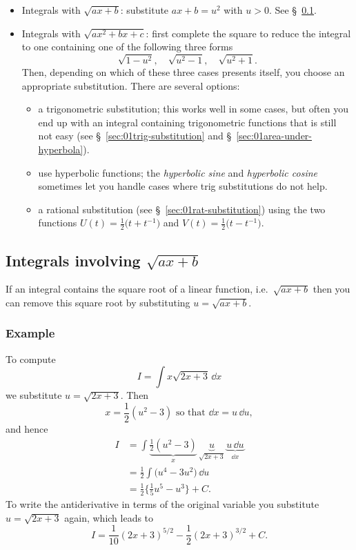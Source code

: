 \begin{itemize}
\item Integrals with $\sqrt{ax+b}$: substitute $ax+b = u^2$ with $u>0$. See
  \S~\ref{sec:01root-of-linear-integral}.
\item Integrals with $\sqrt{ax^2+bx+c}$: first complete the square to reduce the
  integral to one containing one of the following three forms
  \[
  \sqrt{1-u^2}, \quad \sqrt{u^2-1}, \quad \sqrt{u^2+1}.
  \]
  Then, depending on which of these three cases presents itself, you choose an
  appropriate substitution.  There are several options:
  \begin{itemize}
  \item a trigonometric substitution; this works well in some cases, but often
    you end up with an integral containing trigonometric functions that is still
    not easy (see \S~\ref{sec:01trig-substitution} and
    \S~\ref{sec:01area-under-hyperbola}).
  \item use hyperbolic functions; the \textit{hyperbolic sine} and
    \textit{hyperbolic cosine} sometimes let you handle cases where trig
    substitutions do not help.
  \item a rational substitution (see \S~\ref{sec:01rat-substitution}) using the
    two functions $U(t) = \frac{1} {2}\bigl(t+t^{-1}\bigr)$ and $V(t) = \frac{1}
    {2}\bigl(t-t^{-1}\bigr)$.
  \end{itemize}
\end{itemize}



\subsection{Integrals involving $\sqrt{ax+b}$}\label{sec:01root-of-linear-integral} %
If an integral contains the square root of a linear function, i.e.~$\sqrt{ax+b}$
then you can remove this square root by substituting $u=\sqrt{ax+b}$.

\subsubsection{Example} To compute
\[
I = \int x\sqrt{2x+3}\, \dd x
\]
we substitute $u=\sqrt{2x+3}$. Then
\[
x = \frac12(u^2-3)\text{ so that } \dd x = u\,\dd u,
\]
and hence
\begin{align*}
  I &= \int\underbrace{\tfrac12(u^2-3)}_{x} \, \underbrace{u}_{\sqrt{2x+3}}
  \, \underbrace{u\, \dd u}_{\dd x}\\
  &= \frac12 \int\bigl(u^4 - 3u^2\bigr)\, \dd u \\
  &= \frac12 \bigl\{\tfrac15 u^5 - u^3\bigr\} +C.
\end{align*}
To write the antiderivative in terms of the original variable you substitute
$u=\sqrt{2x+3}$ again, which leads to
\[
I = \frac{1}{10}(2x+3)^{5/2} - \frac12 (2x+3)^{3/2} +C.
\]

